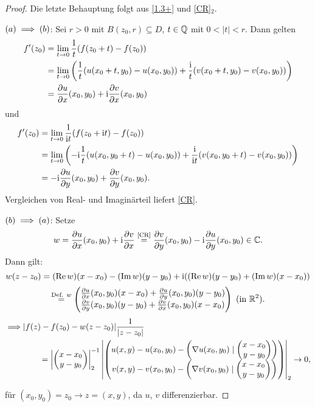 \documentclass[a4paper,twoside,DIV15,BCOR12mm]{scrbook}
\begin{document}
\begin{proof} Die letzte Behauptung folgt aus \eqref{1.3+} und \eqref{CR}$_2$.

\noindent $(a) \implies (b)$: Sei $r > 0$ mit $B(z_0,r) \subseteq D$, $t\in\mathbb{Q}$ mit $0 < |t| < r$. Dann gelten
\begin{align}
f^\prime(z_0) &= \lim_{t\rightarrow 0} \frac{1}{t} (f(z_0+t) - f(z_0))\nonumber\\
&=  \lim_{t\rightarrow 0} \left(\frac{1}{t} (u(x_0+t,y_0)-u(x_0,y_0)) + \frac{\mathrm{i}}{t} (v(x_0+t,y_0)-v(x_0,y_0))\right)\nonumber\\
&=\frac{\partial u}{\partial x} (x_0,y_0) + \mathrm{i}\frac{\partial v}{\partial x} (x_0,y_0)
\end{align} und \begin{align}
f^\prime(z_0) &= \lim_{t\rightarrow 0} \frac{1}{\mathrm{i} t} (f(z_0+\mathrm{i} t) - f(z_0))\nonumber\\
&=  \lim_{t\rightarrow 0} \left(-\mathrm{i}\frac{1}{t} (u(x_0,y_0+t)-u(x_0,y_0)) + \frac{\mathrm{i}}{\mathrm{i} t} (v(x_0,y_0+t)-v(x_0,y_0))\right)\nonumber\\
&=-\mathrm{i}\frac{\partial u}{\partial y} (x_0,y_0) + \frac{\partial v}{\partial y} (x_0,y_0).
\end{align}
Vergleichen von Real- und Imaginärteil liefert \eqref{CR}.

\noindent $(b) \implies (a)$: Setze
\[w=\frac{\partial u}{\partial x} (x_0,y_0) + \mathrm{i}\frac{\partial v}{\partial x}\stackrel{\text{\eqref{CR}}}{=} \frac{\partial v}{\partial y} (x_0,y_0) - \mathrm{i}\frac{\partial u}{\partial y}(x_0,y_0) \in\mathbb{C}.\]
Dann gilt:
\[w(z-z_0) = (\operatorname{Re}{w})(x-x_0) - (\operatorname{Im}{w})(y-y_0) + \mathrm{i}((\operatorname{Re}{w})(y-y_0) + (\operatorname{Im}{w})(x-x_0))\]
\[\stackrel{\text{Def. $w$}}{=} \cmplx{\frac{\partial u}{\partial x} (x_0,y_0)(x-x_0) + \frac{\partial u}{\partial y}(x_0,y_0)(y-y_0)}{\frac{\partial v}{\partial y} (x_0,y_0)(y-y_0) + \frac{\partial v}{\partial x}(x_0,y_0)(x-x_0)}\ \text{(in $\R^2$)}.\]
\begin{align*}
\displaystyle\folgt &|f(z)-f(z_0)-w(z-z_0)|\frac{1}{|z-z_0|}\\
&\qquad= \abs{\cmplx{x-x_0}{y-y_0}}_2^{-1} \abs{\cmplx{u(x,y)-u(x_0,y_0)-\left(\nabla u(x_0,y_0)\mid\cmplx{x-x_0}{y-y_0}\right)}{v(x,y)-v(x_0,y_0)-\left(\nabla v(x_0,y_0)\mid\cmplx{x-x_0}{y-y_0}\right)}}_2 \ra 0,
\end{align*}

für $(x_0,y_0)=z_0 \to z=(x,y)$,
da $u$, $v$ differenzierbar.
\end{proof}
\end{document}
